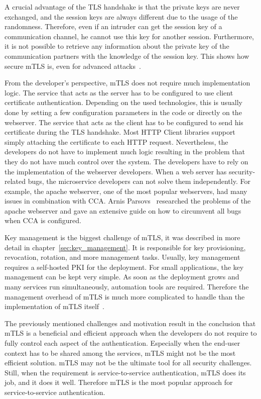 A crucial advantage of the TLS handshake is that the private keys are never exchanged, and the session keys are always different due to the usage of the randomness.
Therefore, even if an intruder can get the session key of a communication channel, he cannot use this key for another session.
Furthermore, it is not possible to retrieve any information about the private key of the communication partners with the knowledge of the session key.
This shows how secure mTLS is, even for advanced attacks~\cite{parsovs2013practical}.

From the developer's perspective, mTLS does not require much implementation logic.
The service that acts as the server has to be configured to use client certificate authentication.
Depending on the used technologies, this is usually done by setting a few configuration parameters in the code or directly on the webserver.
The service that acts as the client has to be configured to send his certificate during the TLS handshake.
Most HTTP Client libraries support simply attaching the certificate to each HTTP request.
Nevertheless, the developers do not have to implement much logic resulting in the problem that they do not have much control over the system.
The developers have to rely on the implementation of the webserver developers.
When a web server has security-related bugs, the microservice developers can not solve them independently.
For example, the apache webserver, one of the most popular webservers, had many issues in combination with CCA.
Arnis Parsovs~\cite{parsovs2013practical} researched the problems of the apache webserver and gave an extensive guide on how to circumvent all bugs when CCA is configured.

Key management is the biggest challenge of mTLS, it was described in more detail in chapter~\ref{sec:key_management}.
It is responsible for key provisioning, revocation, rotation, and more management tasks.
Usually, key management requires a self-hosted PKI for the deployment.
For small applications, the key management can be kept very simple.
As soon as the deployment grows and many services run simultaneously, automation tools are required.
Therefore the management overhead of mTLS is much more complicated to handle than the implementation of mTLS itself~\cite{dias2020microservices}.

The previously mentioned challenges and motivation result in the conclusion that mTLS is a beneficial and efficient approach when the developers do not require to fully control each aspect of the authentication.
Especially when the end-user context has to be shared among the services, mTLS might not be the most efficient solution.
mTLS may not be the ultimate tool for all security challenges.
Still, when the requirement is service-to-service authentication, mTLS does its job, and it does it well.
Therefore mTLS is the most popular approach for service-to-service authentication.

